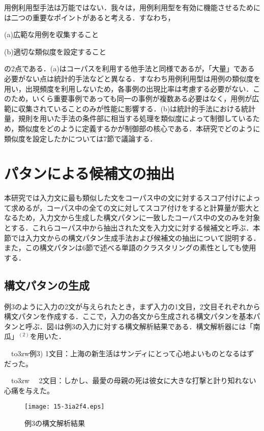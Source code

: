 \documentclass[japanese]{jnlp_1.4}
\begin{document}
用例利用型手法は万能ではない．我々は，用例利用型を有効に機能させるためには二つの重要なポイントがあると考える．すなわち，

(a)広範な用例を収集すること

(b)適切な類似度を設定すること

の2点である．(a)はコーパスを利用する他手法と同様であるが，「大量」である必要がない点は統計的手法などと異なる．すなわち用例利用型は用例の類似度を用い，出現頻度を利用しないため，各事例の出現比率は考慮する必要がない．このため，いくら重要事例であっても同一の事例が複数ある必要はなく，用例が広範に収集されていることのみが性能に影響する．(b)は統計的手法における統計量，規則を用いた手法の条件部に相当する処理を類似度によって制御しているため，類似度をどのように定義するかが制御部の核心である．本研究でどのように類似度を設定したかについては7節で議論する．

\section{パタンによる候補文の抽出}

本研究では入力文に最も類似した文をコーパス中の文に対するスコア付けによって求めるが，コーパス中の全ての文に対してスコア付けをすると計算量が膨大となるため，入力文から生成した構文パタンに一致したコーパス中の文のみを対象とする．これらコーパス中から抽出された文を入力文に対する候補文と呼ぶ．本節では入力文からの構文パタン生成手法および候補文の抽出について説明する．また，この構文パタンは6節で述べる単語のクラスタリングの素性としても使用する．

\subsection{構文パタンの生成}

例3のように入力の2文が与えられたとき，まず入力の1文目，2文目それぞれから構文パタンを作成する．ここで，入力の各文から生成される構文パタンを基本パタンと呼ぶ．図4は例3の入力に対する構文解析結果である．構文解析器には「南瓜」$^{(2)}$を用いた．

\noindent　\hbox to3zw{例3)\hfill}
1文目：上海の新生活はサンディにとって心地よいものとなるはずだった。

\noindent　\hbox to3zw{　\hfill}
2文目：しかし、最愛の母親の死は彼女に大きな打撃と計り知れない心痛を与えた。

\begin{figure}[t]
\centerline{\texttt{[image: 15-3ia2f4.eps]}}
\caption{例3の構文解析結果}
\end{figure}
\end{document}
